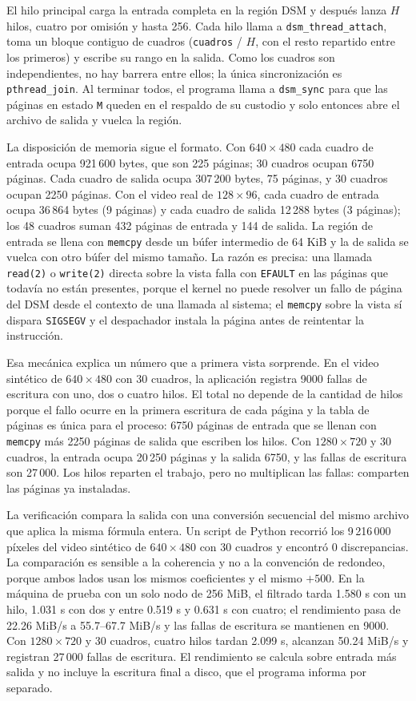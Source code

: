 El hilo principal carga la entrada completa en la región DSM y después lanza $H$ hilos, cuatro por omisión y hasta 256. Cada hilo llama a \texttt{dsm\_thread\_attach}, toma un bloque contiguo de cuadros (\texttt{cuadros} / $H$, con el resto repartido entre los primeros) y escribe su rango en la salida. Como los cuadros son independientes, no hay barrera entre ellos; la única sincronización es \texttt{pthread\_join}. Al terminar todos, el programa llama a \texttt{dsm\_sync} para que las páginas en estado \texttt{M} queden en el respaldo de su custodio y solo entonces abre el archivo de salida y vuelca la región.

La disposición de memoria sigue el formato. Con $640 \times 480$ cada cuadro de entrada ocupa 921\,600 bytes, que son 225 páginas; 30 cuadros ocupan 6750 páginas. Cada cuadro de salida ocupa 307\,200 bytes, 75 páginas, y 30 cuadros ocupan 2250 páginas. Con el video real de $128 \times 96$, cada cuadro de entrada ocupa 36\,864 bytes (9 páginas) y cada cuadro de salida 12\,288 bytes (3 páginas); los 48 cuadros suman 432 páginas de entrada y 144 de salida. La región de entrada se llena con \texttt{memcpy} desde un búfer intermedio de 64 KiB y la de salida se vuelca con otro búfer del mismo tamaño. La razón es precisa: una llamada \texttt{read(2)} o \texttt{write(2)} directa sobre la vista falla con \texttt{EFAULT} en las páginas que todavía no están presentes, porque el kernel no puede resolver un fallo de página del DSM desde el contexto de una llamada al sistema; el \texttt{memcpy} sobre la vista sí dispara \texttt{SIGSEGV} y el despachador instala la página antes de reintentar la instrucción.

Esa mecánica explica un número que a primera vista sorprende. En el video sintético de $640 \times 480$ con 30 cuadros, la aplicación registra 9000 fallas de escritura con uno, dos o cuatro hilos. El total no depende de la cantidad de hilos porque el fallo ocurre en la primera escritura de cada página y la tabla de páginas es única para el proceso: 6750 páginas de entrada que se llenan con \texttt{memcpy} más 2250 páginas de salida que escriben los hilos. Con $1280 \times 720$ y 30 cuadros, la entrada ocupa 20\,250 páginas y la salida 6750, y las fallas de escritura son 27\,000. Los hilos reparten el trabajo, pero no multiplican las fallas: comparten las páginas ya instaladas.

La verificación compara la salida con una conversión secuencial del mismo archivo que aplica la misma fórmula entera. Un script de Python recorrió los 9\,216\,000 píxeles del video sintético de $640 \times 480$ con 30 cuadros y encontró 0 discrepancias. La comparación es sensible a la coherencia y no a la convención de redondeo, porque ambos lados usan los mismos coeficientes y el mismo $+500$. En la máquina de prueba con un solo nodo de 256 MiB, el filtrado tarda 1.580 s con un hilo, 1.031 s con dos y entre 0.519 s y 0.631 s con cuatro; el rendimiento pasa de 22.26 MiB/s a 55.7--67.7 MiB/s y las fallas de escritura se mantienen en 9000. Con $1280 \times 720$ y 30 cuadros, cuatro hilos tardan 2.099 s, alcanzan 50.24 MiB/s y registran 27\,000 fallas de escritura. El rendimiento se calcula sobre entrada más salida y no incluye la escritura final a disco, que el programa informa por separado.

